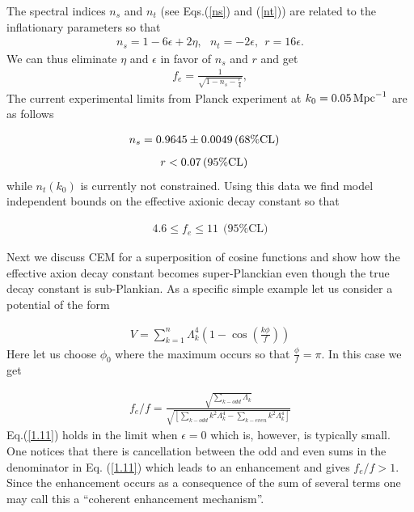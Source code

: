 \documentclass[12pt]{article}
\begin{document}
The spectral indices $n_s$ and $n_t$ (see Eqs.(\ref{ns}) and (\ref{nt}))
are related to the inflationary parameters so that
\begin{align}
  n_s= 1-6\epsilon + 2 \eta, ~~~n_t = -2 \epsilon, ~~ r = 16 \epsilon.
  \label{ns-nt-r}
\end{align}
We can thus eliminate $\eta$ and $\epsilon$ in favor of $n_s$ and $r$ and get
\begin{align}
  f_e=\frac{1}{\sqrt{1-n_s- \frac{r}{4}}},
\end{align}
The current experimental limits from Planck experiment at $k_0=0.05\, {\rm Mpc}^{-1}$ are as follows
~\cite{Adam:2015rua,Ade:2015lrj,Array:2015xqh}

\begin{align}
  n_s & = 0.9645 \pm 0.0049\, (68\% {\rm CL})
\end{align}
\begin{align}
  r & <0.07\, (95\% {\rm CL})
  \label{data}
\end{align}
while $n_t(k_0)$ is currently not constrained.  Using this data we find model independent bounds on the effective axionic decay constant
so that

\begin{align}
  4.6 \leq f_e \leq 11   ~~(95\% \text{CL)}
\end{align}

Next we discuss  CEM for a superposition of cosine functions and show how the effective axion decay constant becomes super-Planckian
even though the true decay constant is sub-Plankian.
As a specific simple example let us consider a potential of the form

\begin{align}
  V = \sum_{k=1}^n\Lambda_k^4 \left(1-\cos(\frac{k\phi}{ f})\right)
  \label{1.1}
\end{align}
Here let us choose $\phi_0$ where the maximum occurs so that $\frac{\phi}{ f}= \pi$. In this case we get

\begin{align}
  {f_e}/f = \frac{\sqrt{ \sum_{k-odd}\Lambda_k}
  }{ \sqrt{\left[ \sum_{k-odd} k^2\Lambda_k^4 - \sum_{k-even} k^2\Lambda_k^4\right]}}
  \label{1.11}
\end{align}
Eq.(\ref{1.11}) holds in the limit when $\epsilon=0$ which is, however, is typically small.
One notices that  there is cancellation between the odd and even sums in the denominator in Eq. (\ref{1.11}) which
leads to an enhancement and gives  $f_e/f >1$. Since the enhancement occurs as a consequence of the sum of several terms  one
may call this  a ``coherent enhancement mechanism''.
\end{document}
